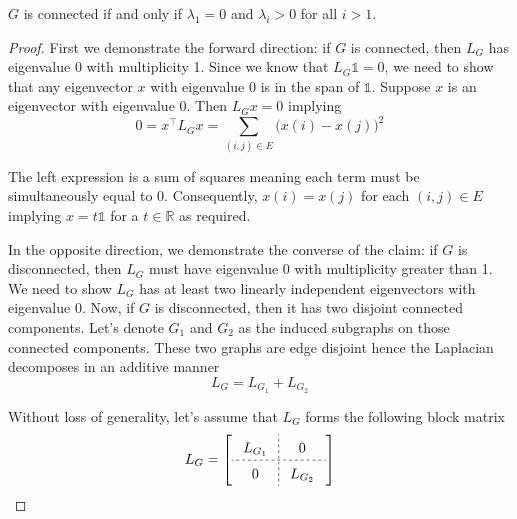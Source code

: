 \begin{theorem}\label{thm:connectivity}
$G$ is connected if and only if $\lambda_1 = 0$ and $\lambda_i > 0$ for all $i > 1$.
\end{theorem}
\begin{proof}
First we demonstrate the forward direction: if $G$ is connected, then $L_G$ has eigenvalue 0 with multiplicity 1. Since we know that $L_G \mathbb{1} = 0$, we need to show that any eigenvector $x$ with eigenvalue 0 is in the span of $\mathbb{1}$. Suppose $x$ is an eigenvector with eigenvalue 0. Then $L_G x = 0$ implying
\begin{equation*}
0
= x^\top L_G x
= \sum_{(i, j) \in E} \big( x(i) - x(j) \big)^2
\end{equation*}

The left expression is a sum of squares meaning each term must be simultaneously equal to 0. Consequently, $x(i) = x(j)$ for each $(i, j) \in E$ implying $x = t\mathbb{1}$ for a $t \in \mathbb{R}$ as required.

In the opposite direction, we demonstrate the converse of the claim: if $G$ is disconnected, then $L_G$ must have eigenvalue 0 with multiplicity greater than 1. We need to show $L_G$ has at least two linearly independent eigenvectors with eigenvalue 0. Now, if $G$ is disconnected, then it has two disjoint connected components. Let's denote $G_1$ and $G_2$ as the induced subgraphs on those connected components. These two graphs are edge disjoint hence the Laplacian decomposes in an additive manner
\begin{equation*}
L_G = L_{G_1} + L_{G_2}
\end{equation*}

Without loss of generality, let's assume that $L_G$ forms the following block matrix
\begin{equation*}
\arraycolsep=8pt\def\arraystretch{1.5}
L_G = \left[
    \begin{array}{c;{2pt/2pt}c}
      L_{G_1} & 0 \\ \hdashline[2pt/2pt]
      0 & L_{G_2}
    \end{array}
  \right]
\end{equation*}


\end{proof}
